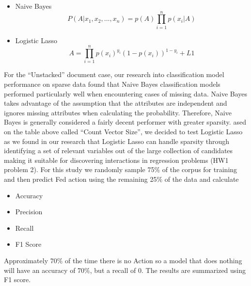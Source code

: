 \documentclass[11pt]{article}
\newcommand{\vertSpace}[1]{\vspace{3mm}}
\begin{document}
{\begin{itemize}
\item Naive Bayes
\begin{equation*}
P(A|x_1,x_2,...,x_n) = p(A)\prod_{i=1}^n p(x_i|A)
\end{equation*}

\item Logistic Lasso
\begin{equation*}
A = \prod_{i=1}^n p(x_i)^{y_i}(1-p(x_i))^{1-y_i}+ L1
\end{equation*}
\end{itemize}



For the ``Unstacked'' document case, our research into classification model performance on sparse data found that Naive Bayes classification models performed particularly well when encountering cases of missing data.  Naive Bayes takes advantage of the assumption that the attributes are independent and ignores missing attributes when calculating the probability.  Therefore, Naive Bayes is generally considered a fairly decent performer with greater sparsity.  \vertSpace  


Based on the table above called ``Count Vector Size'', we decided to test Logistic Lasso as we found in our research that Logistic Lasso can handle sparsity through identifying a set of relevant variables out of the large collection of candidates making it suitable for discovering interactions in regression problems (HW1 problem 2). \vertSpace 





\subsubsection{Training, Testing, and Determining the Efficacy of the Models}
For this study we randomly sample 75$\%$ of the corpus for training and then 
predict Fed action using the remaining 25$\%$ of the data and calculate
\begin{itemize}
\item Accuracy
\item Precision
\item Recall
\item F1 Score
\end{itemize}
Approximately 70$\%$ of the time there is no Action so a model that does nothing will
have an accuracy of 70$\%$, but a recall of 0.  The results are summarized using F1
score.

}
\end{document}
